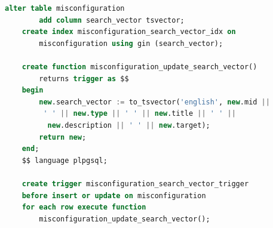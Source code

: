\begin{lstlisting}[language=SQL, caption={[Search vector definition for misconfiguration inside the database initial script] Search vector definition for \lstinline{misconfiguration} inside the database initial script.}, label={lst:db-search-vector}]
    alter table misconfiguration 
        add column search_vector tsvector;
    create index misconfiguration_search_vector_idx on 
        misconfiguration using gin (search_vector);
    
    create function misconfiguration_update_search_vector() 
        returns trigger as $$
    begin
        new.search_vector := to_tsvector('english', new.mid ||
         ' ' || new.type || ' ' || new.title || ' ' ||
          new.description || ' ' || new.target);
        return new;
    end;
    $$ language plpgsql;
    
    create trigger misconfiguration_search_vector_trigger
    before insert or update on misconfiguration
    for each row execute function 
        misconfiguration_update_search_vector();
\end{lstlisting}